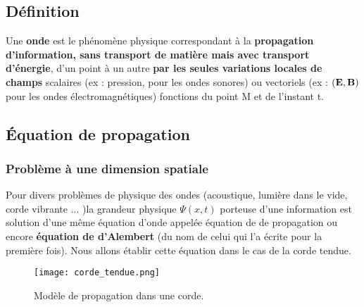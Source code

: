 \documentclass[11pt,a4paper]{report}
\begin{document}
\subsection{Définition}

Une \textbf{onde} est le phénomène physique correspondant à la \textbf{propagation d'information, sans transport de matière mais avec transport d'énergie}, d'un point
à un autre \textbf{par les seules variations locales de champs} scalaires (ex : pression, pour les ondes sonores) ou vectoriels (ex : $(\bold{E},\bold{B})$ pour les ondes électromagnétiques) fonctions du point M et de l'instant t.

\subsection{\'Equation de propagation}

\subsubsection{Problème à une dimension spatiale}

Pour divers problèmes de physique des ondes (acoustique, lumière dans le vide, corde vibrante ... )la grandeur physique $\Psi(x,t)$ porteuse d'une information est solution d'une même équation d'onde appelée équation de de propagation ou encore \textbf{équation de d'Alembert} (du nom de celui qui l'a écrite pour la première fois). Nous allons établir cette équation dans le cas de la corde tendue.\\

\begin{figure}[h!]
\begin{center}
	\texttt{[image: corde\_tendue.png]}
	\caption{Modèle de propagation dans une corde.} 
	\label{fig:corde_tendue}
\end{center}
\end{figure}
\end{document}
